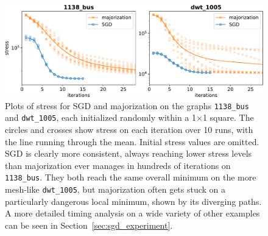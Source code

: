 \begin{figure}
  \centering
  \includegraphics[width=.9\textwidth]{stress/iterations.pdf}
  \caption[Results against majorization for \texttt{1138\_bus} and \texttt{dwt\_1005}]{Plots of stress for SGD and majorization on the graphs \texttt{1138\_bus} and \texttt{dwt\_1005}, each initialized randomly within a 1$\times$1 square.
  The circles and crosses show stress on each iteration over 10 runs, with the line running through the mean.
  Initial stress values are omitted.
  SGD is clearly more consistent, always reaching lower stress levels than majorization ever manages in hundreds of iterations on \texttt{1138\_bus}.
  They both reach the same overall minimum on the more mesh-like \texttt{dwt\_1005}, but majorization often gets stuck on a particularly dangerous local minimum, shown by its diverging paths.
  A more detailed timing analysis on a wide variety of other examples can be seen in Section~\ref{sec:sgd_experiment}.
  }
  \label{fig:stress_plots}
  \vspace*{\floatsep}
  \vspace*{\floatsep}
  \removeAlgorithmFigureError
  \begin{algorithm}[H]
    
\end{algorithm}
\end{figure}
